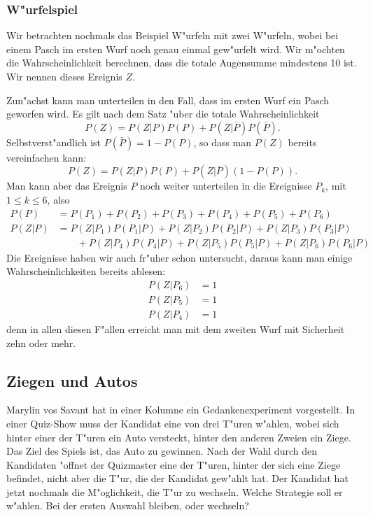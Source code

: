 \subsubsection{W"urfelspiel}
Wir betrachten nochmals das Beispiel W"urfeln mit zwei W"urfeln, wobei
bei einem Pasch im ersten Wurf noch genau einmal gew"urfelt wird.
Wir m"ochten die Wahrscheinlichkeit berechnen, dass die totale Augensumme
mindestens 10 ist.
Wir nennen dieses Ereignis $Z$.

Zun"achst kann man unterteilen in den Fall, dass im ersten Wurf
ein Pasch geworfen wird.
Es gilt nach dem Satz "uber die totale Wahrscheinlichkeit
\[
P(Z) = P(Z|P) P(P) + P(Z|\bar P) P(\bar P).
\]
Selbstverst"andlich ist $P(\bar P)=1-P(P)$, so dass man $P(Z)$ bereits
vereinfachen kann:
\[
P(Z) = P(Z|P) P(P) + P(Z|\bar P) (1-P(P)).
\]
Man kann aber das Ereignis $P$ noch weiter unterteilen in die
Ereignisse $P_k$, mit $1\le k\le 6$, also
\begin{align*}
P(P)&=
P(P_1)+
P(P_2)+
P(P_3)+
P(P_4)+
P(P_5)+
P(P_6)
\\
P(Z|P)
&=
P(Z|P_1)P(P_1|P)+
P(Z|P_2)P(P_2|P)+
P(Z|P_3)P(P_3|P)
\\
&\qquad +
P(Z|P_4)P(P_4|P)+
P(Z|P_5)P(P_5|P)+
P(Z|P_6)P(P_6|P)
\end{align*}
Die Ereignisse haben wir auch fr"uher schon untersucht, daraus kann
man einige Wahrscheinlichkeiten bereits ablesen:
\begin{align*}
P(Z|P_6)&=1\\
P(Z|P_5)&=1\\
P(Z|P_4)&=1
\end{align*}
denn in allen diesen F"allen erreicht man mit dem zweiten Wurf mit
Sicherheit zehn oder mehr.

\subsection{Ziegen und Autos} \label{ziegen:autos}
Marylin vos Savant hat in einer Kolumne ein Gedankenexperiment vorgestellt.
In einer Quiz-Show muss der Kandidat eine von drei T"uren w"ahlen, wobei
sich hinter einer der T"uren ein Auto versteckt, hinter den anderen Zweien
ein Ziege.
Das Ziel des Spiels ist, das Auto zu gewinnen.
Nach der Wahl
durch den Kandidaten "offnet der Quizmaster eine der T"uren, hinter der sich
eine Ziege befindet, nicht aber die T"ur, die der Kandidat gew"ahlt hat.
Der Kandidat hat jetzt nochmals die M"oglichkeit, die T"ur zu wechseln.
Welche Strategie soll er w"ahlen.
Bei der ersten Auswahl bleiben, oder
wechseln?

